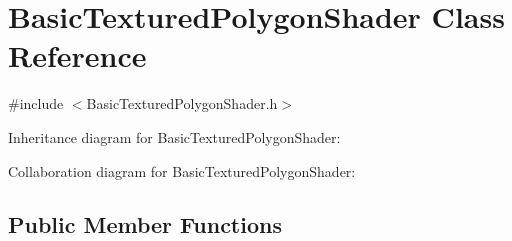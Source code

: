\hypertarget{class_basic_textured_polygon_shader}{}\section{Basic\+Textured\+Polygon\+Shader Class Reference}
\label{class_basic_textured_polygon_shader}


{\ttfamily \#include $<$Basic\+Textured\+Polygon\+Shader.\+h$>$}



Inheritance diagram for Basic\+Textured\+Polygon\+Shader\+:


Collaboration diagram for Basic\+Textured\+Polygon\+Shader\+:
\subsection*{Public Member Functions}
